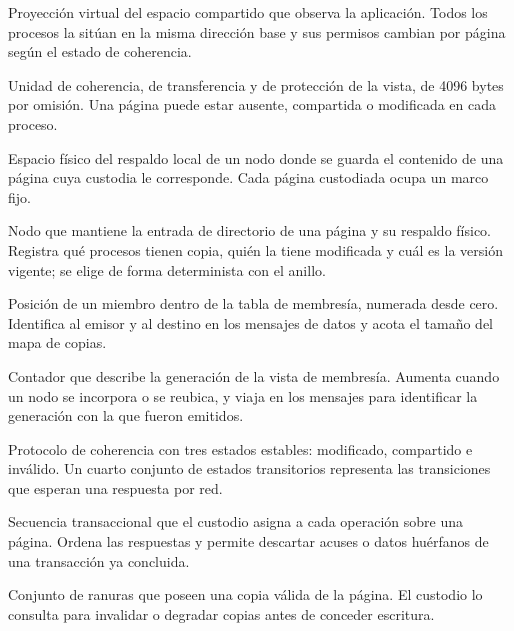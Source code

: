 \begin{description}[leftmargin=2.7cm, style=nextline, itemsep=0.35em]

\item[Vista] Proyección virtual del espacio compartido que observa la aplicación. Todos los procesos la sitúan en la misma dirección base y sus permisos cambian por página según el estado de coherencia.

\item[Página] Unidad de coherencia, de transferencia y de protección de la vista, de 4096 bytes por omisión. Una página puede estar ausente, compartida o modificada en cada proceso.

\item[Marco] Espacio físico del respaldo local de un nodo donde se guarda el contenido de una página cuya custodia le corresponde. Cada página custodiada ocupa un marco fijo.

\item[Home o custodio] Nodo que mantiene la entrada de directorio de una página y su respaldo físico. Registra qué procesos tienen copia, quién la tiene modificada y cuál es la versión vigente; se elige de forma determinista con el anillo.

\item[Ranura] Posición de un miembro dentro de la tabla de membresía, numerada desde cero. Identifica al emisor y al destino en los mensajes de datos y acota el tamaño del mapa de copias.

\item[Época] Contador que describe la generación de la vista de membresía. Aumenta cuando un nodo se incorpora o se reubica, y viaja en los mensajes para identificar la generación con la que fueron emitidos.

\item[MSI] Protocolo de coherencia con tres estados estables: modificado, compartido e inválido. Un cuarto conjunto de estados transitorios representa las transiciones que esperan una respuesta por red.

\item[tseq] Secuencia transaccional que el custodio asigna a cada operación sobre una página. Ordena las respuestas y permite descartar acuses o datos huérfanos de una transacción ya concluida.

\item[Copyset] Conjunto de ranuras que poseen una copia válida de la página. El custodio lo consulta para invalidar o degradar copias antes de conceder escritura.


\end{description}
